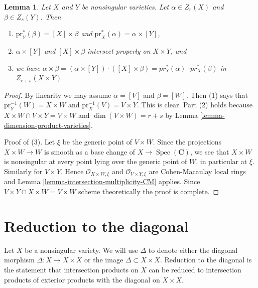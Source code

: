 \documentclass{stacks-project}
\theoremstyle{plain}
\newtheorem{lemma}[subsection]{Lemma}
\theoremstyle{definition}
\theoremstyle{remark}
\numberwithin{equation}{subsection}
\def\Spec{\mathop{\mathrm{Spec}}}
\begin{document}
\begin{lemma}
\label{lemma-exterior-product}
Let $X$ and $Y$ be nonsingular varieties.
Let $\alpha \in Z_r(X)$ and $\beta \in Z_s(Y)$.
Then
\begin{enumerate}
\item $\text{pr}_Y^*(\beta) = [X] \times \beta$ and
$\text{pr}_X^*(\alpha) = \alpha \times [Y]$,
\item $\alpha \times [Y]$ and $[X]\times \beta$
intersect properly on $X\times Y$, and
\item we have
$\alpha \times \beta =
(\alpha \times [Y])\cdot ([X]\times\beta) =
pr_Y^*(\alpha) \cdot pr_X^*(\beta)$
in $Z_{r + s}(X \times Y)$.
\end{enumerate}
\end{lemma}

\begin{proof}
By linearity we may assume $\alpha = [V]$ and $\beta = [W]$.
Then (1) says that $\text{pr}_Y^{-1}(W) = X \times W$ and
$\text{pr}_X^{-1}(V) = V \times Y$. This is clear.
Part (2) holds because $X \times W \cap V \times Y = V \times W$ and
$\dim(V \times W) = r + s$ by Lemma \ref{lemma-dimension-product-varieties}.

\medskip\noindent
Proof of (3).
Let $\xi$ be the generic point of $V \times W$.
Since the projections $X \times W \to W$ is smooth as a base change of
$X \to \Spec(\mathbf{C})$, we see that $X \times W$ is nonsingular
at every point lying over the generic point of $W$, in particular at $\xi$.
Similarly for $V \times Y$. Hence $\mathcal{O}_{X \times W, \xi}$
and $\mathcal{O}_{V \times Y, \xi}$ are Cohen-Macaulay local rings
and Lemma \ref{lemma-intersection-multiplicity-CM} applies.
Since $V \times Y \cap X \times W = V \times W$ scheme theoretically
the proof is complete.
\end{proof}



\section{Reduction to the diagonal}
\label{section-reduction-diagonal}

\noindent
Let $X$ be a nonsingular variety. We will use $\Delta$
to denote either the diagonal morphism $\Delta : X \to X \times X$
or the image $\Delta \subset X \times X$.
Reduction to the diagonal is the statement that
intersection products on $X$ can be reduced to intersection products
of exterior products with the diagonal on $X \times X$.
\end{document}
